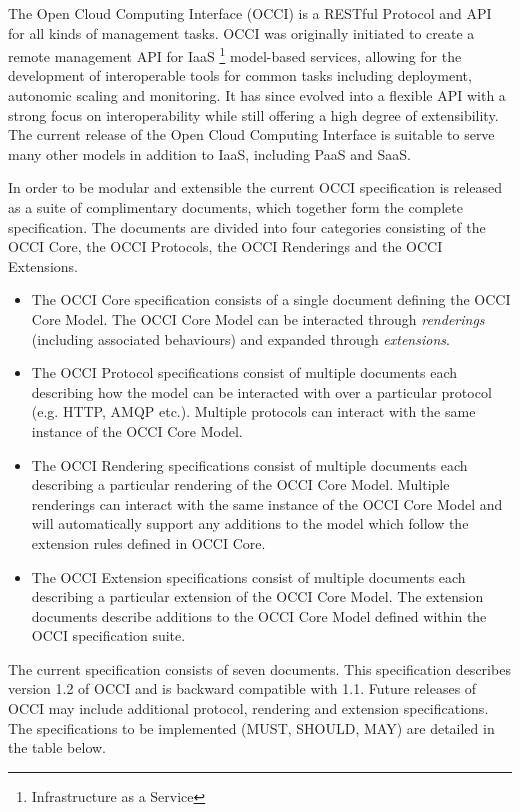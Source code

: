 The Open Cloud Computing Interface (OCCI) is a RESTful Protocol and
API for all kinds of management tasks. OCCI was originally initiated
to create a remote management API for IaaS%
\footnote{Infrastructure as a Service}
model-based services, allowing for the development of interoperable tools for
common tasks including deployment, autonomic scaling and monitoring.
%
It has since evolved into a flexible API with a strong focus on
interoperability while still offering a high degree of extensibility. The
current release of the Open Cloud Computing Interface is suitable to serve many
other models in addition to IaaS, including PaaS and SaaS.

In order to be modular and extensible the current OCCI specification is
released as a suite of complimentary documents, which together form the complete
specification.
%
The documents are divided into four categories consisting of the OCCI Core,
the OCCI Protocols, the OCCI Renderings and the OCCI Extensions.
%
\begin{itemize}
\item The OCCI Core specification consists of a single document defining the
 OCCI Core Model. The OCCI Core Model can be interacted through {\em
 renderings} (including associated behaviours) and expanded through {\em extensions}.
\item The OCCI Protocol specifications consist of multiple documents each
 describing how the model can be interacted with over a particular protocol (e.g. HTTP, AMQP etc.). 
 Multiple protocols can interact with the same instance of the OCCI Core Model.
\item The OCCI Rendering specifications consist of multiple documents each
 describing a particular rendering of the OCCI Core Model. Multiple renderings can
 interact with the same instance of the OCCI Core Model and will automatically support
 any additions to the model which follow the extension rules defined in OCCI
 Core.
\item The OCCI Extension specifications consist of multiple documents
  each describing a particular extension of the OCCI Core Model. The
  extension documents describe additions to the OCCI Core Model
  defined within the OCCI specification suite.
\end{itemize}
%

The current specification consists of seven documents. This 
specification describes version 1.2 of OCCI and is backward compatible with 1.1. 
Future releases of OCCI
may include additional protocol, rendering and extension specifications. The specifications to be 
implemented (MUST, SHOULD, MAY) are detailed in the table below.

